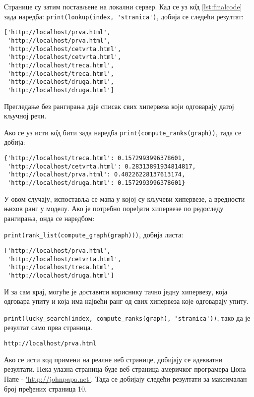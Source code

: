 Странице су затим постављене на локални сервер. Кад се уз к\^{о}д
\ref{lst:finalcode} зада наредба:
\lstinline{print(lookup(index, 'stranica')}, добија се следећи резултат:

\begin{lstlisting}
['http://localhost/prva.html',
 'http://localhost/prva.html',
 'http://localhost/cetvrta.html',
 'http://localhost/cetvrta.html',
 'http://localhost/treca.html',
 'http://localhost/treca.html',
 'http://localhost/druga.html',
 'http://localhost/druga.html']
\end{lstlisting}

Прегледање без рангирања даје списак свих хипервеза који одговарају датој
кључној речи.

Ако се уз исти к\^{о}д бити зада наредба
\lstinline{print(compute_ranks(graph))}, тада се добија:

\begin{lstlisting}
{'http://localhost/treca.html': 0.1572993996378601,
 'http://localhost/cetvrta.html': 0.28313891934814817,
 'http://localhost/prva.html': 0.40226228137613174,
 'http://localhost/druga.html': 0.1572993996378601}
\end{lstlisting}

У овом случају, испоставља се мапа у којој су кључеви хипервезе, а вредности
њихов ранг у моделу.
Ако је потребно поређати хипервезе по редоследу рангирања, онда се наредбом:

\lstinline{print(rank_list(compute_graph(graph)))}, добија листа:

\begin{lstlisting}
['http://localhost/prva.html',
 'http://localhost/cetvrta.html',
 'http://localhost/treca.html',
 'http://localhost/druga.html']
\end{lstlisting}

И за сам крај, могуће је доставити кориснику тачно једну хипервезу, која
одговара упиту и која има највећи ранг од свих хипервеза које одговарају упиту.

\lstinline{print(lucky_search(index, compute_ranks(graph), 'stranica'))},
тако да је резултат само прва страница.

\begin{lstlisting}
http://localhost/prva.html
\end{lstlisting}

Ако се исти код примени на реалне веб странице, добијају се адекватни
резултати. Нека улазна страница буде веб страница америчког програмера
Џона Папе - \url{'http://johnpapa.net'}. Тада се
добијају следећи резултати за максималан број пређених страница 10.

